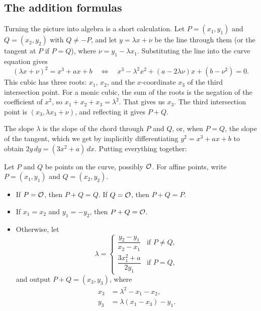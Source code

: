\subsection{The addition formulas}

Turning the picture into algebra is a short calculation.
Let $P = (x_1, y_1)$ and $Q = (x_2, y_2)$ with $Q \neq -P$, and let
$y = \lambda x + \nu$ be the line through them (or the tangent at $P$
if $P = Q$), where $\nu = y_1 - \lambda x_1$.
Substituting the line into the curve equation gives
\[ (\lambda x + \nu)^2 = x^3 + ax + b
   \quad\Longleftrightarrow\quad
   x^3 - \lambda^2 x^2 + (a - 2\lambda\nu)x + (b - \nu^2) = 0. \]
This cubic has three roots: $x_1$, $x_2$, and the $x$-coordinate $x_3$ of
the third intersection point.
For a monic cubic, the sum of the roots is the negation of the
coefficient of $x^2$, so $x_1 + x_2 + x_3 = \lambda^2$.
That gives us $x_3$.
The third intersection point is $(x_3, \lambda x_3 + \nu)$,
and reflecting it gives $P + Q$.

The slope $\lambda$ is the slope of the chord through $P$ and $Q$, or,
when $P = Q$, the slope of the tangent, which we get by implicitly
differentiating $y^2 = x^3 + ax + b$ to obtain $2y \, dy = (3x^2 + a)\, dx$.
Putting everything together:

\begin{definition}\label{defn:ecadd}
Let $P$ and $Q$ be points on the curve, possibly $\mathcal{O}$.
For affine points, write $P = (x_1, y_1)$ and $Q = (x_2, y_2)$.
\begin{itemize}[noitemsep]
  \item If $P = \mathcal{O}$, then $P + Q = Q$. If $Q = \mathcal{O}$, then $P + Q = P$.
  \item If $x_1 = x_2$ and $y_1 = -y_2$, then $P + Q = \mathcal{O}$.
  \item Otherwise, let
  \[ \lambda =
     \begin{cases}
       \dfrac{y_2 - y_1}{x_2 - x_1} & \text{if } P \neq Q,\\[2ex]
       \dfrac{3x_1^2 + a}{2y_1}     & \text{if } P = Q,
     \end{cases}
  \]
  and output $P + Q = (x_3, y_3)$, where
  \begin{align*}
    x_3 &= \lambda^2 - x_1 - x_2,\\
    y_3 &= \lambda(x_1 - x_3) - y_1.
  \end{align*}
\end{itemize}
\end{definition}

